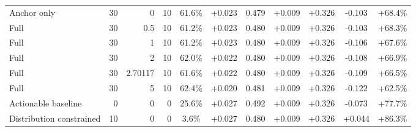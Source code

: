 \begin{table}[htbp]
\begin{tabular}{lrrrccccccc}
Anchor only & 30 & 0 & 10 & 61.6\% & +0.023 & 0.479 & +0.009 & +0.326 & -0.103 & +68.4\% \\
Full & 30 & 0.5 & 10 & 61.2\% & +0.023 & 0.480 & +0.009 & +0.326 & -0.103 & +68.3\% \\
Full & 30 & 1 & 10 & 61.2\% & +0.023 & 0.480 & +0.009 & +0.326 & -0.106 & +67.6\% \\
Full & 30 & 2 & 10 & 62.0\% & +0.022 & 0.480 & +0.009 & +0.326 & -0.108 & +66.9\% \\
Full & 30 & 2.70117 & 10 & 61.6\% & +0.022 & 0.480 & +0.009 & +0.326 & -0.109 & +66.5\% \\
Full & 30 & 5 & 10 & 62.4\% & +0.020 & 0.481 & +0.009 & +0.326 & -0.122 & +62.5\% \\
Actionable baseline & 0 & 0 & 0 & 25.6\% & +0.027 & 0.492 & +0.009 & +0.326 & -0.073 & +77.7\% \\
Distribution constrained & 10 & 0 & 0 & 3.6\% & +0.027 & 0.480 & +0.009 & +0.326 & +0.044 & +86.3\% \\
\bottomrule
\end{tabular}
\end{table}